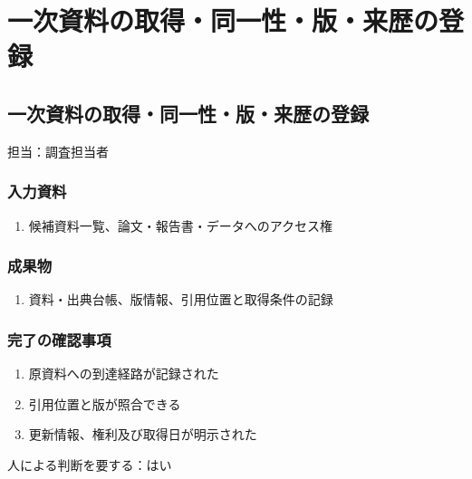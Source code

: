 \documentclass[a4paper,11pt]{article}
\begin{document}
\section{一次資料の取得・同一性・版・来歴の登録}
\subsection{一次資料の取得・同一性・版・来歴の登録}
\par 担当：調査担当者\par\medskip
\subsubsection*{入力資料}
\begin{enumerate}[leftmargin=2em,itemsep=0.35em]
\item 候補資料一覧、論文・報告書・データへのアクセス権
\end{enumerate}
\subsubsection*{成果物}
\begin{enumerate}[leftmargin=2em,itemsep=0.35em]
\item 資料・出典台帳、版情報、引用位置と取得条件の記録
\end{enumerate}
\subsubsection*{完了の確認事項}
\begin{enumerate}[leftmargin=2em,itemsep=0.35em]
\item 原資料への到達経路が記録された
\item 引用位置と版が照合できる
\item 更新情報、権利及び取得日が明示された
\end{enumerate}
\par 人による判断を要する：はい\par\medskip
\end{document}
